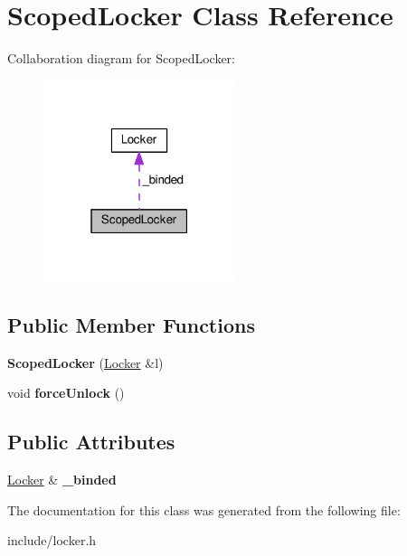\hypertarget{class_scoped_locker}{}\section{Scoped\+Locker Class Reference}
\label{class_scoped_locker}


Collaboration diagram for Scoped\+Locker\+:
\nopagebreak
\begin{figure}[H]
\begin{center}
\leavevmode
\includegraphics[width=159pt]{class_scoped_locker__coll__graph}
\end{center}
\end{figure}
\subsection*{Public Member Functions}
\begin{DoxyCompactItemize}
\item 
{\bfseries Scoped\+Locker} (\hyperlink{class_locker}{Locker} \&l)\hypertarget{class_scoped_locker_a934b25a7af086a7230e96256ab2f54be}{}\label{class_scoped_locker_a934b25a7af086a7230e96256ab2f54be}

\item 
void {\bfseries force\+Unlock} ()\hypertarget{class_scoped_locker_a5a9c0873fb7c11ea588b627497208a41}{}\label{class_scoped_locker_a5a9c0873fb7c11ea588b627497208a41}

\end{DoxyCompactItemize}
\subsection*{Public Attributes}
\begin{DoxyCompactItemize}
\item 
\hyperlink{class_locker}{Locker} \& {\bfseries \+\_\+binded}\hypertarget{class_scoped_locker_abfc68c3a65391f09b81de01492bc60be}{}\label{class_scoped_locker_abfc68c3a65391f09b81de01492bc60be}

\end{DoxyCompactItemize}


The documentation for this class was generated from the following file\+:\begin{DoxyCompactItemize}
\item 
include/locker.\+h\end{DoxyCompactItemize}
